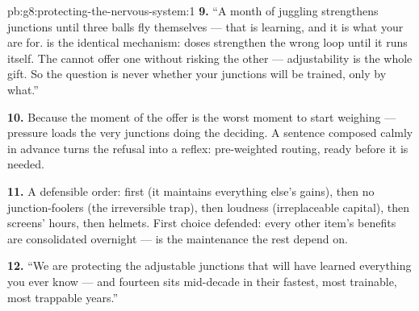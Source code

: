 \begin{solution}{pb:g8:protecting-the-nervous-system:1}
\textbf{9.} ``A month of juggling strengthens junctions
until three balls fly themselves --- that is learning,
and it is what your  are for.  is the
identical mechanism: doses strengthen the wrong loop
until it runs itself. The  cannot offer one without
risking the other --- adjustability is the whole gift.
So the question is never whether your junctions will be
trained, only by what.''

\textbf{10.} Because the moment of the offer is the worst
moment to start weighing --- pressure loads the very
junctions doing the deciding. A sentence composed calmly
in advance turns the refusal into a reflex: pre-weighted
routing, ready before it is needed.

\textbf{11.} A defensible order:  first (it
maintains everything else's gains), then no
junction-foolers (the irreversible trap), then loudness
(irreplaceable capital), then screens' hours, then
helmets. First choice defended: every other item's
benefits are consolidated overnight ---  is the
maintenance the rest depend on.

\textbf{12.} ``We are protecting the adjustable junctions
that will have learned everything you ever know --- and
fourteen sits mid-decade in their fastest, most
trainable, most trappable years.''
\end{solution}
